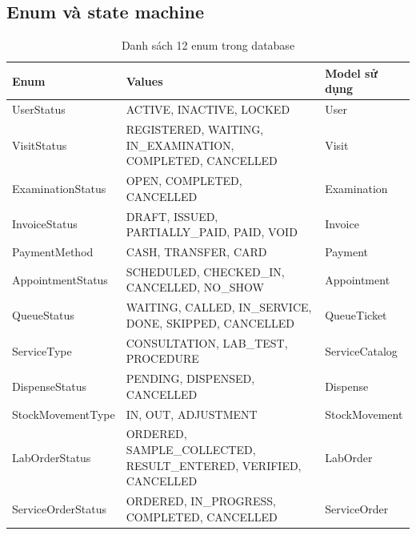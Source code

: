 \subsection{Enum và state machine}

\begin{longtable}{|p{4cm}|p{8cm}|p{3cm}|}
\caption{Danh sách 12 enum trong database}\\
\hline
\textbf{Enum} & \textbf{Values} & \textbf{Model sử dụng} \\
\hline
UserStatus & ACTIVE, INACTIVE, LOCKED & User \\
\hline
VisitStatus & REGISTERED, WAITING, IN\_EXAMINATION, COMPLETED, CANCELLED & Visit \\
\hline
ExaminationStatus & OPEN, COMPLETED, CANCELLED & Examination \\
\hline
InvoiceStatus & DRAFT, ISSUED, PARTIALLY\_PAID, PAID, VOID & Invoice \\
\hline
PaymentMethod & CASH, TRANSFER, CARD & Payment \\
\hline
AppointmentStatus & SCHEDULED, CHECKED\_IN, CANCELLED, NO\_SHOW & Appointment \\
\hline
QueueStatus & WAITING, CALLED, IN\_SERVICE, DONE, SKIPPED, CANCELLED & QueueTicket \\
\hline
ServiceType & CONSULTATION, LAB\_TEST, PROCEDURE & ServiceCatalog \\
\hline
DispenseStatus & PENDING, DISPENSED, CANCELLED & Dispense \\
\hline
StockMovementType & IN, OUT, ADJUSTMENT & StockMovement \\
\hline
LabOrderStatus & ORDERED, SAMPLE\_COLLECTED, RESULT\_ENTERED, VERIFIED, CANCELLED & LabOrder \\
\hline
ServiceOrderStatus & ORDERED, IN\_PROGRESS, COMPLETED, CANCELLED & ServiceOrder \\
\hline
\end{longtable}

